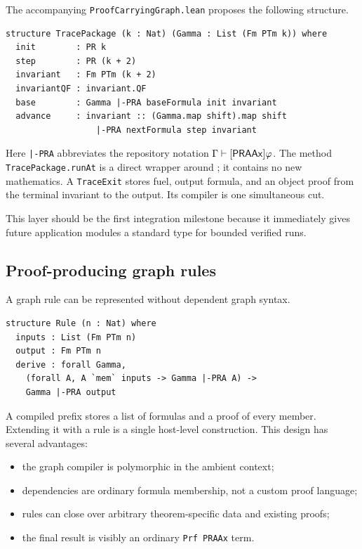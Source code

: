 The accompanying \texttt{ProofCarryingGraph.lean} proposes the following
structure.

\begin{lstlisting}[language={}]
structure TracePackage (k : Nat) (Gamma : List (Fm PTm k)) where
  init        : PR k
  step        : PR (k + 2)
  invariant   : Fm PTm (k + 2)
  invariantQF : invariant.QF
  base        : Gamma |-PRA baseFormula init invariant
  advance     : invariant :: (Gamma.map shift).map shift
                  |-PRA nextFormula step invariant
\end{lstlisting}

Here \texttt{|-PRA} abbreviates the repository notation
\(\Gamma\vdash[\mathsf{PRAAx}]\varphi\).  The method
\texttt{TracePackage.runAt} is a direct wrapper around
; it contains no new mathematics.  A
\texttt{TraceExit} stores fuel, output formula, and an object proof from the
terminal invariant to the output.  Its compiler is one simultaneous cut.

This layer should be the first integration milestone because it immediately
gives future application modules a standard type for bounded verified runs.

\subsection{Proof-producing graph rules}

A graph rule can be represented without dependent graph syntax.

\begin{lstlisting}[language={}]
structure Rule (n : Nat) where
  inputs : List (Fm PTm n)
  output : Fm PTm n
  derive : forall Gamma,
    (forall A, A `mem` inputs -> Gamma |-PRA A) ->
    Gamma |-PRA output
\end{lstlisting}

A compiled prefix stores a list of formulas and a proof of every member.
Extending it with a rule is a single host-level construction.  This design has
several advantages:

\begin{itemize}
\item the graph compiler is polymorphic in the ambient context;
\item dependencies are ordinary formula membership, not a custom proof
language;
\item rules can close over arbitrary theorem-specific data and existing
proofs;
\item the final result is visibly an ordinary \texttt{Prf PRAAx} term.
\end{itemize}

